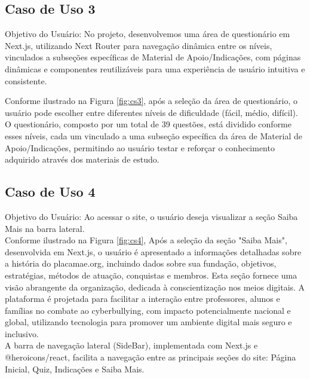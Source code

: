 \subsection{Caso de Uso 3}
Objetivo do Usuário: No projeto, desenvolvemos uma área de questionário em Next.js, utilizando Next Router para navegação dinâmica entre os níveis, vinculados a subseções específicas de Material de Apoio/Indicações, com páginas dinâmicas e componentes reutilizáveis para uma experiência de usuário intuitiva e consistente.


Conforme ilustrado na Figura \ref{fig:cs3}, após a seleção da área de questionário, o usuário pode escolher entre diferentes níveis de dificuldade (fácil, médio, difícil). O questionário, composto por um total de 39 questões, está dividido conforme esses níveis, cada um vinculado a uma subseção específica da área de Material de Apoio/Indicações, permitindo ao usuário testar e reforçar o conhecimento adquirido através dos materiais de estudo.

\subsection{Caso de Uso 4} 
Objetivo do Usuário: Ao acessar o site, o usuário deseja visualizar a seção Saiba Mais na barra lateral.\\

Conforme ilustrado na Figura \ref{fig:cs4}, Após a seleção da seção "Saiba Mais", desenvolvida em Next.js, o usuário é apresentado a informações detalhadas sobre a história do placamae.org, incluindo dados sobre sua fundação, objetivos, estratégias, métodos de atuação, conquistas e membros. Esta seção fornece uma visão abrangente da organização, dedicada à conscientização nos meios digitais. A plataforma é projetada para facilitar a interação entre professores, alunos e famílias no combate ao cyberbullying, com impacto potencialmente nacional e global, utilizando tecnologia para promover um ambiente digital mais seguro e inclusivo.\\

A barra de navegação lateral (SideBar), implementada com Next.js e @heroicons/react, facilita a navegação entre as principais seções do site: Página Inicial, Quiz, Indicações e Saiba Mais.



